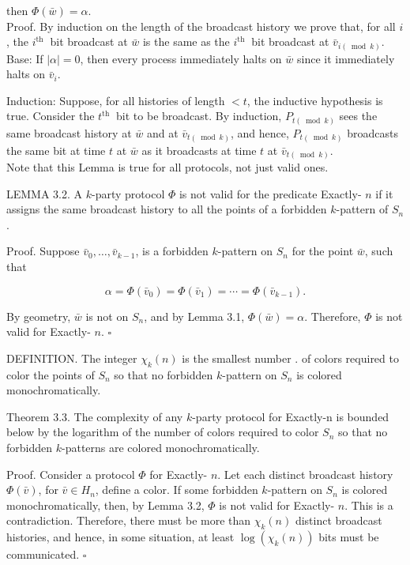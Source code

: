 \documentclass[10pt]{article}
\begin{document}
then $\Phi(\bar{w})=\alpha$.\\
Proof. By induction on the length of the broadcast history we prove that, for all $i$, the $i^{\text {th }}$ bit broadcast at $\bar{w}$ is the same as the $i^{\text {th }}$ bit broadcast at $\bar{v}_{i(\bmod k)}$.\\
Base: If $|\alpha|=0$, then every process immediately halts on $\bar{w}$ since it immediately halts on $\bar{v}_{i}$.

Induction: Suppose, for all histories of length $<t$, the inductive hypothesis is true. Consider the $t^{\text {th }}$ bit to be broadcast. By induction, $P_{t(\bmod k)}$ sees the same broadcast history at $\bar{w}$ and at $\bar{v}_{t(\bmod k)}$, and hence, $P_{t(\bmod k)}$ broadcasts the same bit at time $t$ at $\bar{w}$ as it broadcasts at time $t$ at $\bar{v}_{t(\bmod k)}$.\\
Note that this Lemma is true for all protocols, not just valid ones.

LEMMA 3.2. A $k$-party protocol $\Phi$ is not valid for the predicate Exactly- $n$ if it assigns the same broadcast history to all the points of a forbidden $k$-pattern of $S_{n}$.

Proof. Suppose $\bar{v}_{0}, \ldots, \bar{v}_{k-1}$, is a forbidden $k$-pattern on $S_{n}$ for the point $\bar{w}$, such that

$$
\alpha=\Phi\left(\bar{v}_{0}\right)=\Phi\left(\bar{v}_{1}\right)=\cdots=\Phi\left(\bar{v}_{k-1}\right) .
$$

By geometry, $\bar{w}$ is not on $S_{n}$, and by Lemma 3.1, $\Phi(\bar{w})=\alpha$. Therefore, $\Phi$ is not valid for Exactly- $n$. \(\square\)

DEFINITION. The integer $\chi_{k}(n)$ is the smallest number . of colors required to color the points of $S_{n}$ so that no forbidden $k$-pattern on $S_{n}$ is colored monochromatically.

Theorem 3.3. The complexity of any $k$-party protocol for Exactly-n is bounded below by the logarithm of the number of colors required to color $S_{n}$ so that no forbidden $k$-patterns are colored monochromatically.

Proof. Consider a protocol $\Phi$ for Exactly- $n$. Let each distinct broadcast history $\Phi(\bar{v})$, for $\bar{v} \in H_{n}$, define a color. If some forbidden $k$-pattern on $S_{n}$ is colored monochromatically, then, by Lemma 3.2, $\Phi$ is not valid for Exactly- $n$. This is a contradiction. Therefore, there must be more than $\chi_{k}(n)$ distinct broadcast histories, and hence, in some situation, at least $\log \left(\chi_{k}(n)\right)$ bits must be communicated. \(\square\)
\end{document}
